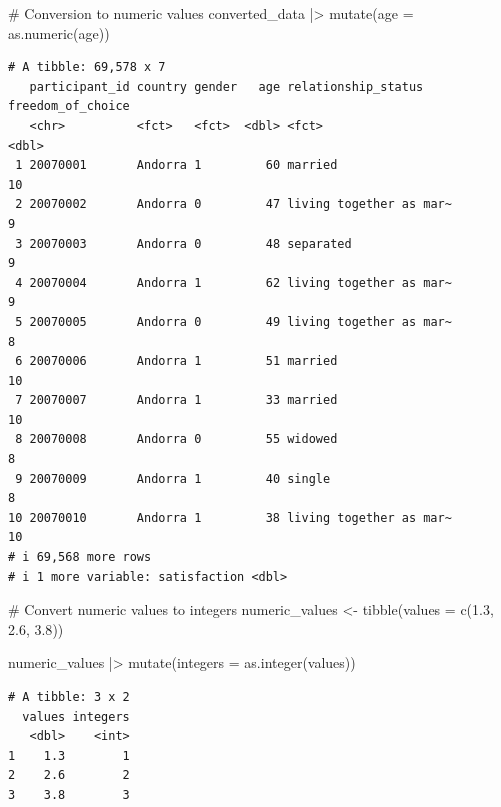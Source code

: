\documentclass[
  letterpaper,
]{krantz}
\makeatletter
\newenvironment{Shaded}{\begin{snugshade}}{\end{snugshade}}
\newcommand{\AttributeTok}[1]{\textcolor[rgb]{0.40,0.45,0.13}{#1}}
\newcommand{\CommentTok}[1]{\textcolor[rgb]{0.37,0.37,0.37}{#1}}
\newcommand{\FloatTok}[1]{\textcolor[rgb]{0.68,0.00,0.00}{#1}}
\newcommand{\FunctionTok}[1]{\textcolor[rgb]{0.28,0.35,0.67}{#1}}
\newcommand{\NormalTok}[1]{\textcolor[rgb]{0.00,0.23,0.31}{#1}}
\newcommand{\OtherTok}[1]{\textcolor[rgb]{0.00,0.23,0.31}{#1}}
\newcommand{\SpecialCharTok}[1]{\textcolor[rgb]{0.37,0.37,0.37}{#1}}
\newenvironment{kframe}{%
\medskip{}
\setlength{\fboxsep}{.8em}
 \def\at@end@of@kframe{}%
 \ifinner\ifhmode%
  \def\at@end@of@kframe{\end{minipage}}%
  \begin{minipage}{\columnwidth}%
 \fi\fi%
 \def\FrameCommand##1{\hskip\@totalleftmargin \hskip-\fboxsep
 \colorbox{shadecolor}{##1}\hskip-\fboxsep
     \hskip-\linewidth \hskip-\@totalleftmargin \hskip\columnwidth}%
 \MakeFramed {\advance\hsize-\width
   \@totalleftmargin\z@ \linewidth\hsize
   \@setminipage}}%
 {\par\unskip\endMakeFramed%
 \at@end@of@kframe}
\renewenvironment{Shaded}{\begin{kframe}}{\end{kframe}}
\makeatother
\begin{document}
\begin{Shaded}
\begin{Highlighting}[]
\CommentTok{\# Conversion to numeric values}
\NormalTok{converted\_data }\SpecialCharTok{|\textgreater{}}
  \FunctionTok{mutate}\NormalTok{(}\AttributeTok{age =} \FunctionTok{as.numeric}\NormalTok{(age))}
\end{Highlighting}
\end{Shaded}

\begin{verbatim}
# A tibble: 69,578 x 7
   participant_id country gender   age relationship_status     freedom_of_choice
   <chr>          <fct>   <fct>  <dbl> <fct>                               <dbl>
 1 20070001       Andorra 1         60 married                                10
 2 20070002       Andorra 0         47 living together as mar~                 9
 3 20070003       Andorra 0         48 separated                               9
 4 20070004       Andorra 1         62 living together as mar~                 9
 5 20070005       Andorra 0         49 living together as mar~                 8
 6 20070006       Andorra 1         51 married                                10
 7 20070007       Andorra 1         33 married                                10
 8 20070008       Andorra 0         55 widowed                                 8
 9 20070009       Andorra 1         40 single                                  8
10 20070010       Andorra 1         38 living together as mar~                10
# i 69,568 more rows
# i 1 more variable: satisfaction <dbl>
\end{verbatim}

\begin{Shaded}
\begin{Highlighting}[]
\CommentTok{\# Convert numeric values to integers}
\NormalTok{numeric\_values }\OtherTok{\textless{}{-}} \FunctionTok{tibble}\NormalTok{(}\AttributeTok{values =} \FunctionTok{c}\NormalTok{(}\FloatTok{1.3}\NormalTok{, }\FloatTok{2.6}\NormalTok{, }\FloatTok{3.8}\NormalTok{))}

\NormalTok{numeric\_values }\SpecialCharTok{|\textgreater{}}
  \FunctionTok{mutate}\NormalTok{(}\AttributeTok{integers =} \FunctionTok{as.integer}\NormalTok{(values))}
\end{Highlighting}
\end{Shaded}

\begin{verbatim}
# A tibble: 3 x 2
  values integers
   <dbl>    <int>
1    1.3        1
2    2.6        2
3    3.8        3
\end{verbatim}
\end{document}
